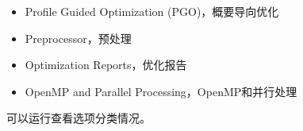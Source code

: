 \documentclass[a4paper,12pt,english]{sphinxmanual}
\begin{document}
\begin{description}
\begin{itemize}
\end{itemize}

\begin{itemize}
\item {} 
\sphinxAtStartPar
Profile Guided Optimization (PGO)，概要导向优化

\end{itemize}

\begin{itemize}
\item {} 
\sphinxAtStartPar
Preprocessor，预处理

\end{itemize}

\begin{itemize}
\item {} 
\sphinxAtStartPar
Optimization Reports，优化报告

\end{itemize}

\begin{itemize}
\item {} 
\sphinxAtStartPar
OpenMP and Parallel Processing，OpenMP和并行处理

\end{itemize}

\end{description}

\sphinxAtStartPar
可以运行查看选项分类情况。
\end{document}
